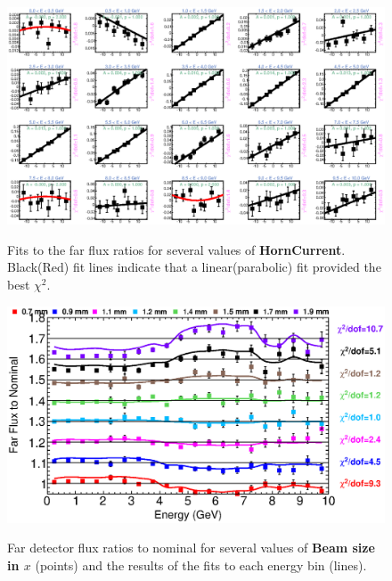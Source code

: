 {\begin{figure}[ht]
  \begin{center}
    {\includegraphics[width=5.0in]{figures/HornCurrent_far_fits.eps}}
  \end{center}
\caption{ Fits to the far flux ratios for several values of {\bf HornCurrent}. Black(Red) fit lines indicate that a linear(parabolic) fit provided the best $\chi^2$. }
\end{figure}

\begin{figure}[ht]
  \begin{center}
    {\includegraphics[width=6.0in]{figures/BeamSigmaX_far_summary.eps}}
  \end{center}
\caption{ Far detector flux ratios to nominal for several values of {\bf Beam size in $x$} (points) and the results of the fits to each energy bin (lines).}
\end{figure}

}
